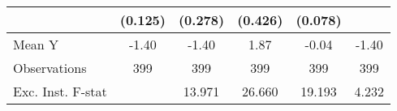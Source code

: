 {\begin{tabular}{l*{5}{c}}
            &     (0.125)         &     (0.278)         &     (0.426)         &     (0.078)         &                     \\
\midrule
Mean Y      &       -1.40         &       -1.40         &        1.87         &       -0.04         &       -1.40         \\
Observations&         399         &         399         &         399         &         399         &         399         \\
Exc. Inst. F-stat&                     &      13.971         &      26.660         &      19.193         &       4.232         \\
\bottomrule
\end{tabular}
}

